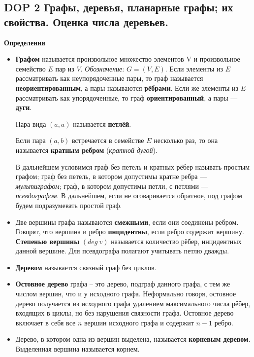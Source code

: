 \subsection*{DOP 2 Графы,  деревья,  планарные графы;  их свойства.  Оценка числа деревьев.}

\textbf{Определения}
\begin{itemize}
\item \textbf{Графом} называется произвольное множество элементов V и произвольное семейство $E$ пар из $V$. \textit{Обозначение}: $G = (V, E)$.
Если элементы из $E$ рассматривать как неупорядоченные пары, то граф называется \textbf{неориентированным}, а пары называются \textbf{рёбрами}. 
Если же элементы из $E$ рассматривать как упорядоченные, то граф \textbf{ориентированный}, а пары --- \textbf{дуги}.

Пара вида $(a, a)$ называется \textbf{петлёй}.

Если пара $(a, b)$ встречается в семействе $E$ несколько раз, то она называется \textbf{кратным ребром} (\textit{кратной дугой}).


В дальнейшем условимся граф без петель и кратных рёбер называть простым графом; граф без петель, в котором допустимы кратне ребра --- \textit{мультиграфом}; граф, в котором допустимы петли, с петлями --- \textit{псевдографом}. В дальнейшем, если не оговаривается обратное, под графом будем подразумевать простой граф.

\item Две вершины графа называются \textbf{смежными}, если они соединены ребром. Говорят, что вершина и ребро \textbf{инцидентны}, если ребро содержит вершину. \textbf{Степенью вершины} $(deg~v)$ называется количество рёбер, инцидентных данной вершине. Для псевдографа полагают учитывать петлю дважды.

\item \textbf{Деревом} называется связный граф без циклов. %

\item \textbf{Остовное дерево} графа -- это дерево, подграф данного графа, с тем же числом вершин, что и у исходного графа. Неформально говоря, остовное дерево получается из исходного графа удалением максимального числа рёбер, входящих в циклы, но без нарушения связности графа. Остовное дерево включает в себя все $n$ вершин исходного графа и содержит $n-1$ ребро.


\item  Дерево, в котором одна из вершин выделена, называется \textbf{корневым деревом}. Выделенная вершина называется корнем.


\end{itemize}
